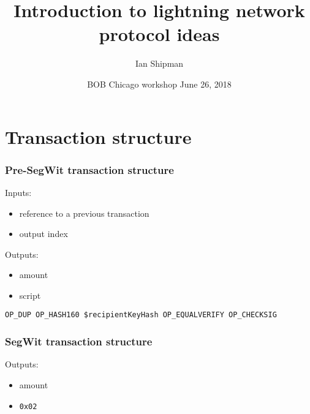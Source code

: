 \documentclass{beamer}
\title{Introduction to lightning network protocol ideas}
\author{Ian Shipman}
\date{BOB Chicago {workshop} June 26, 2018}
\begin{document}
\frame{\titlepage}
\section{Transaction structure}
\begin{frame}
	\frametitle{Pre-SegWit transaction structure}
	Inputs:
	\begin{itemize}
		\item reference to a previous transaction
		\item output index
	\end{itemize}
	Outputs:
	\begin{itemize}
		\item amount
		\item script 
	\end{itemize}
	\pause
	\begin{example}[P2KH script]
		\small{\texttt{OP\_DUP OP\_HASH160 \$recipientKeyHash OP\_EQUALVERIFY OP\_CHECKSIG}}
	\end{example}
\end{frame}
\begin{frame}
	\frametitle{SegWit transaction structure}
	Outputs:
	\begin{itemize}
		\item amount
		\item \small{\texttt{0x02}}
	\end{itemize}
\end{frame}
\end{document}
